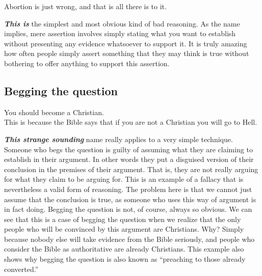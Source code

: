 \documentclass[12pt, openany]{book}
\begin{document}
\begin{center}

\begin{argument}

Abortion is just wrong, and that is all there is to it.

\end{argument}

\end{center}

\textbf{\emph{This is}} the simplest and most obvious kind of bad reasoning. As the name implies, mere assertion involves simply stating what you want to establish without presenting any evidence whatsoever to support it. It is truly amazing how often people simply assert something that they may think is true without bothering to offer anything to support this assertion.

\hypertarget{begging-the-question}{%
\subsection*{Begging the question}\label{begging-the-question}}


\begin{center}

\begin{argument}

You should become a Christian.\\
This is because the Bible says that if you are not a Christian you will go to Hell.

\end{argument}

\end{center}

\textbf{\emph{This strange sounding}} name really applies to a very simple technique. Someone who begs the question is guilty of assuming what they are claiming to establish in their argument. In other words they put a disguised version of their conclusion in the premises of their argument. That is, they are not really arguing for what they claim to be arguing for. This is an example of a fallacy that is nevertheless a valid form of reasoning. The problem here is that we cannot just assume that the conclusion is true, as someone who uses this way of argument is in fact doing. Begging the question is not, of course, always so obvious. We can see that this is a case of begging the question when we realize that the only people who will be convinced by this argument are Christians. Why? Simply because nobody else will take evidence from the Bible seriously, and people who consider the Bible as authoritative are already Christians. This example also shows why begging the question is also known as ``preaching to those already converted.''
\end{document}
